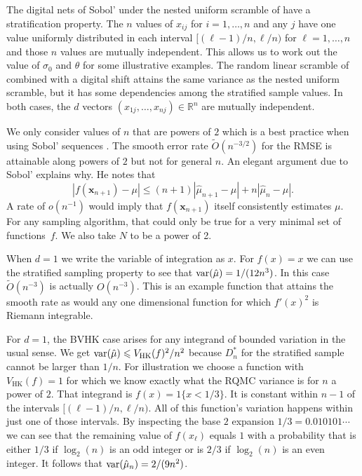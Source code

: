 \documentclass{article}
\newcommand{\art}[1]{\begingroup\color{blue}#1\endgroup}
\renewcommand{\le}{\leqslant}
\newcommand{\real}{\mathbb{R}}
\newcommand{\bsx}{\boldsymbol{x}}
\newcommand{\hk}{\mathrm{HK}}
\begin{document}
The digital nets of Sobol' \cite{Sob67} under the nested
uniform scramble of \cite{Owe95} have a stratification
property.  The $n$ values of $x_{ij}$ for $i=1,\dots,n$
and any $j$ have one value uniformly
distributed in each interval \art{$[(\ell-1)/n,\ell/n)$
for $\ell=1,\dots,n$} and those $n$ values are mutually
independent. This allows us to work out
the value of $\sigma_0$ and $\theta$ for some illustrative
examples.  The random linear scramble of \cite{Mat98} combined
with a digital shift attains the same variance as the nested
uniform scramble, but it has some dependencies among the stratified
sample values.  In both cases, the $d$ vectors $(x_{1j},
\dots,x_{nj})\in\real^n$ are mutually independent.

We only consider values of $n$ that are powers of $2$
which is a best practice when using Sobol' sequences \cite{Owe22a}.
The smooth error rate $\tilde O(n^{-3/2})$ for the RMSE
is attainable along powers of $2$
but not for general $n$. An elegant argument due
to Sobol' \cite{sobo:1998} explains why.
He notes that
$$
|f(\bsx_{n+1})-\mu|
\le (n+1)|\hat\mu_{n+1}-\mu|+n|\hat\mu_n-\mu|.
$$
A rate of $o(n^{-1})$ would imply that $f(\bsx_{n+1})$ itself
consistently estimates $\mu$. For any sampling
algorithm, that could only be true for a very minimal 
set of functions~$f$.
We also take $N$ to be a power of 2.

When $d=1$ we write the variable of integration as $x$.
For $f(x)=x$ we can use the stratified sampling property
to see that $\operatorname{var}(\hat\mu) = 1/(12n^3)$.
In this case $\tilde O(n^{-3})$ is actually $O(n^{-3})$.
This is an example function that attains the smooth
rate as would any one dimensional function for
which $f'(x)^2$ is Riemann integrable.

For $d=1$, the BVHK case arises for any integrand
of bounded variation in the usual sense.
We get $\var(\hat\mu)\le V_{\hk}(f)^2/n^2$
because $D_n^*$ for the stratified sample
cannot be larger than $1/n$. 
For illustration we choose a function with $V_{\hk}(f)=1$
for which we know exactly what the RQMC variance is
for $n$ a power of $2$.
That integrand is $f(x)=1\{x<1/3\}$.
It is constant within $n-1$ of the intervals \art{$[(\ell-1)/n,\ell/n)$.}
All of this function's variation happens 
\art{within just one of those intervals.}
By inspecting the base $2$ expansion $1/3=0.010101\cdots$
we can see that the remaining value of $f(x_\ell)$ equals
$1$ with a probability that is either $1/3$ if $\log_2(n)$
is an odd integer or is $2/3$ if $\log_2(n)$ is an
even integer. It follows that $\operatorname{var}(\hat\mu_n)=2/(9n^2)$.
\end{document}
